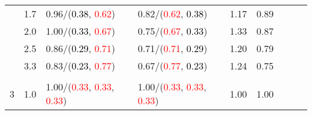 \documentclass[10pt,a4paper]{report}
\begin{document}
\begin{table}[!htbp]
\begin{center}
{\begin{tabular}{ccllccccc}
				  & 1.7                               & 0.96/(\textcolor{black}{0.38}, \textcolor{red}{0.62})                                                                                                                                         & 0.82/(\textcolor{red}{0.62}, \textcolor{black}{0.38})                                                                                                                                         & 1.17             & 0.89                     \\
				  & 2.0                               & 1.00/(\textcolor{black}{0.33}, \textcolor{red}{0.67})                                                                                                                                         & 0.75/(\textcolor{red}{0.67}, \textcolor{black}{0.33})                                                                                                                                         & 1.33             & 0.87                     \\
				  & 2.5                               & 0.86/(\textcolor{black}{0.29}, \textcolor{red}{0.71})                                                                                                                                         & 0.71/(\textcolor{red}{0.71}, \textcolor{black}{0.29})                                                                                                                                         & 1.20             & 0.79                     \\
				  & 3.3                               & 0.83/(\textcolor{black}{0.23}, \textcolor{red}{0.77})                                                                                                                                         & 0.67/(\textcolor{red}{0.77}, \textcolor{black}{0.23})                                                                                                                                         & 1.24             & 0.75                     \\
				  &                                   &                                                                                                                                                                                               &                                                                                                                                                                                               &                                             \\
				3 & 1.0                               & 1.00/(\textcolor{red}{0.33}, \textcolor{red}{0.33}, \textcolor{red}{0.33})                                                                                                                    & 1.00/(\textcolor{red}{0.33}, \textcolor{red}{0.33}, \textcolor{red}{0.33})                                                                                                                    & 1.00             & 1.00                     \\

\end{tabular}}
\end{center}
\end{table}
\end{document}
